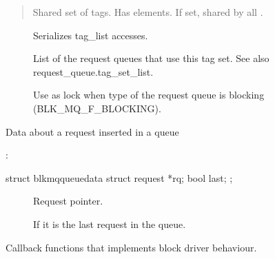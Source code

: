 \documentclass[a4paper,11pt,english]{sphinxmanual}
\begin{document}
\begin{quote}

Shared set of tags. Has  elements. If set,
shared by all .
\end{quote}
\begin{description}
\item[{}] \leavevmode
Serializes tag\_list accesses.

\item[{}] \leavevmode
List of the request queues that use this tag set. See also
request\_queue.tag\_set\_list.

\item[{}] \leavevmode
Use as lock when type of the request queue is blocking
(BLK\_MQ\_F\_BLOCKING).

\end{description}

\begin{fulllineitems}
\label{\detokenize{blk-mq:c.blk_mq_queue_data}}
Data about a request inserted in a queue

\end{fulllineitems}


:

\begin{sphinxVerbatim}[commandchars=\\\{\}]
struct blk\PYGZus{}mq\PYGZus{}queue\PYGZus{}data \PYGZob{}
    struct request *rq;
    bool last;
\PYGZcb{};
\end{sphinxVerbatim}

\begin{description}
\item[{}] \leavevmode
Request pointer.

\item[{}] \leavevmode
If it is the last request in the queue.

\end{description}

\begin{fulllineitems}
\label{\detokenize{blk-mq:c.blk_mq_ops}}
Callback functions that implements block driver behaviour.

\end{fulllineitems}
\end{document}
